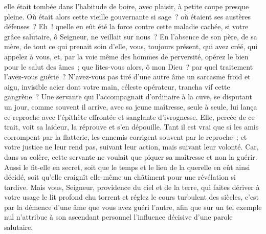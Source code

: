 \documentclass[french,twoside]{book} %
\begin{document}
\noindent elle était tombée dans l’habitude de boire, avec plaisir, à petite coupe presque pleine. Où était alors cette vieille gouvernante si sage ? où étaient ses austères défenses ? Eh ! quelle en eût été la force contre cette maladie cachée, si votre grâce salutaire, ô Seigneur, ne veillait sur nous ? En l’absence de son père, de sa mère, de tout ce qui prenait soin d’elle, vous, toujours présent, qui avez créé, qui appelez à vous, et, par la voie même des hommes de perversité, opérez le bien pour le salut des âmes ; que lites-vous alors, ô mon Dieu ? par quel traitement l’avez-vous guérie ? N’avez-vous pas tiré d’une autre âme un sarcasme froid et aigu, invisible acier dont votre main, céleste opérateur, trancha vif cette gangrène ? Une servante qui l’accompagnait d’ordinaire à la cuve, se disputant un jour, comme souvent il arrive, avec sa jeune maîtresse, seule à seule, lui lança ce reproche avec l’épithète effrontée et sanglante d’ivrognesse. Elle, percée de ce trait, voit sa laideur, la réprouve et s’en dépouille. Tant il est vrai que si les amis corrompent par la flatterie, les ennemis corrigent souvent par le reproche ; et votre justice ne leur rend pas, suivant leur action, mais suivant leur volonté. Car, dans sa colère, cette servante ne voulait que piquer sa maîtresse et non la guérir. Aussi le fit-elle en secret, soit que le temps et le lieu de la querelle en eût ainsi décidé, soit qu’elle craignît elle-même un châtiment pour une révélation si tardive. Mais vous, Seigneur, providence du ciel et de la terre, qui faites dériver à votre usage le lit profond chu torrent et réglez le cours turbulent des siècles, c’est par la démence d’une âme que vous avez guéri l’autre, afin que sur un tel exemple nul n’attribue à son ascendant personnel l’influence décisive d’une parole salutaire.
\end{document}
